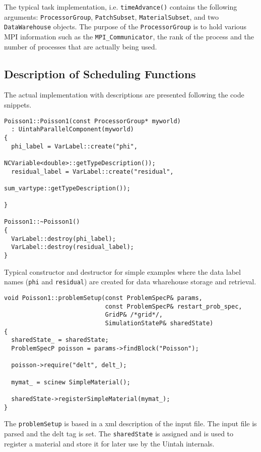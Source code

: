 \documentclass[12pt]{report}
\begin{document}
The typical task implementation, i.e. \texttt{timeAdvance()} contains
the following arguments: \texttt{ProcessorGroup},
\texttt{PatchSubset}, \texttt{MaterialSubset}, and two
\texttt{DataWarehouse} objects.  The purpose of the
\texttt{ProcessorGroup} is to hold various MPI information such as the
\texttt{MPI\_Communicator}, the rank of the process and the number of
processes that are actually being used.

\subsection{Description of Scheduling Functions}

The actual implementation with descriptions are presented following
the code snippets.

\begin{verbatim}
Poisson1::Poisson1(const ProcessorGroup* myworld)
  : UintahParallelComponent(myworld)
{
  phi_label = VarLabel::create("phi", 
                               NCVariable<double>::getTypeDescription());
  residual_label = VarLabel::create("residual", 
                                    sum_vartype::getTypeDescription());

}

Poisson1::~Poisson1()
{
  VarLabel::destroy(phi_label);
  VarLabel::destroy(residual_label);
}

\end{verbatim}

Typical constructor and destructor for simple examples where the data
label names (\texttt{phi} and \texttt{residual}) are created for data
wharehouse storage and retrieval.

\begin{verbatim}
void Poisson1::problemSetup(const ProblemSpecP& params,
                            const ProblemSpecP& restart_prob_spec,
                            GridP& /*grid*/,
                            SimulationStateP& sharedState)
{
  sharedState_ = sharedState;
  ProblemSpecP poisson = params->findBlock("Poisson");

  poisson->require("delt", delt_);

  mymat_ = scinew SimpleMaterial();

  sharedState->registerSimpleMaterial(mymat_);
}
\end{verbatim}

The \texttt{problemSetup} is based in a xml description of the input
file.  The input file is parsed and the delt tag is set.  The
\texttt{sharedState} is assigned and is used to register a material
and store it for later use by the Uintah internals.
\end{document}
